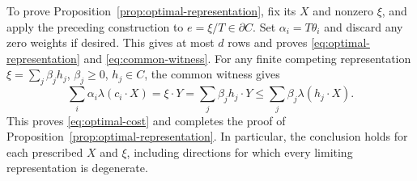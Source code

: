 To prove Proposition~\ref{prop:optimal-representation}, fix its
$X$ and nonzero $\xi$, and apply the preceding construction to
$e=\xi/T\in\partial C$. Set $\alpha_i=T\theta_i$ and discard any
zero weights if desired. This gives at most $d$ rows and proves
\eqref{eq:optimal-representation} and \eqref{eq:common-witness}.
For any finite competing representation
$\xi=\sum_j\beta_jh_j$, $\beta_j\ge0$, $h_j\in C$, the common
witness gives
\[
 \sum_i\alpha_i\lambda(c_i\cdot X)
 =\xi\cdot Y
 =\sum_j\beta_j h_j\cdot Y
 \le\sum_j\beta_j\lambda(h_j\cdot X).
\]
This proves \eqref{eq:optimal-cost} and completes the proof of
Proposition~\ref{prop:optimal-representation}. In particular,
the conclusion holds for each prescribed $X$ and $\xi$, including
directions for which every limiting representation is degenerate.
